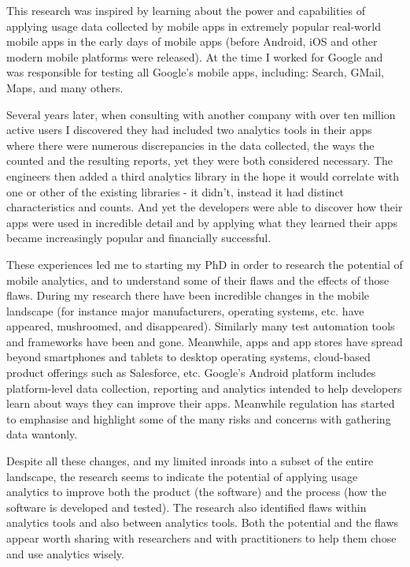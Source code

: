 This research was inspired by learning about the power and capabilities of applying usage data collected by mobile apps in extremely popular real-world mobile apps in the early days of mobile apps (before Android, iOS and other modern mobile platforms were released). At the time I worked for Google and was responsible for testing all Google's mobile apps, including: Search, GMail, Maps, and many others.

Several years later, when consulting with another company with over ten million active users I discovered they had included two analytics tools in their apps where there were numerous discrepancies in the data collected, the ways the counted and the resulting reports, yet they were both considered necessary. The engineers then added a third analytics library in the hope it would correlate with one or other of the existing libraries - it didn't, instead it had distinct characteristics and counts. And yet the developers were able to discover how their apps were used in incredible detail and by applying what they learned their apps became increasingly popular and financially successful.

These experiences led me to starting my PhD in order to research the potential of mobile analytics, and to understand some of their flaws and the effects of those flaws. During my research there have been incredible changes in the mobile landscape (for instance major manufacturers, operating systems, etc. have appeared, mushroomed, and disappeared). Similarly many test automation tools and frameworks have been and gone. Meanwhile, apps and app stores have spread beyond smartphones and tablets to desktop operating systems, cloud-based product offerings such as Salesforce, etc. Google's Android platform includes platform-level data collection, reporting and analytics intended to help developers learn about ways they can improve their apps. Meanwhile regulation has started to emphasise and highlight some of the many risks and concerns with gathering data wantonly. 

Despite all these changes, and my limited inroads into a subset of the entire landscape, the research seems to indicate the potential of applying usage analytics to improve both the product (the software) and the process (how the software is developed and tested). The research also identified flaws within analytics tools and also between analytics tools. Both the potential and the flaws appear worth sharing with researchers and with practitioners to help them chose and use analytics wisely.



